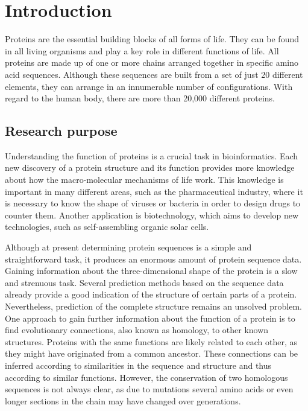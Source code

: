 \setcounter{page}{0}
\setcounter{page}{1}

\chapter{Introduction}
\label{ch:Introduction}


\thispagestyle{standard}
\pagestyle{standard}


Proteins are the essential building blocks of all forms of life. They can be found in all living organisms and play a key role in different functions of life. All proteins are made up of one or more chains arranged together in specific amino acid sequences. Although these sequences are built from a set of just 20 different elements, they can arrange in an innumerable number of configurations. With regard to the human body, there are more than 20,000 different proteins. 

\section{Research purpose}

Understanding the function of  proteins is a crucial task in bioinformatics. Each new discovery of a protein structure and its function provides more knowledge about how the macro-molecular mechanisms of life work. This knowledge is important in many different areas, such as the  pharmaceutical industry, where it is necessary to know the shape of viruses or bacteria in order to design drugs to counter them. Another application is biotechnology, which aims to develop new technologies, such as \mbox{self-assembling} organic solar cells. 

Although at present  determining protein sequences is a simple and straightforward task, it produces an enormous amount of protein sequence data. Gaining information about the three-dimensional shape of the protein is a slow and strenuous task. Several prediction methods based on the sequence data already provide a good indication of the structure of certain parts of a protein. Nevertheless, prediction of the complete structure remains an unsolved problem. 
One approach to gain further information about the function of a protein is to find evolutionary connections, also known as homology, to other known structures. Proteins with the same functions are likely related to each other, as they might have originated from a common ancestor. These connections can be inferred according to similarities in the sequence and structure and thus according to similar functions. However, the conservation of two homologous sequences is not always clear, as due to mutations several amino acids or even longer sections in the chain may have changed over generations. 




